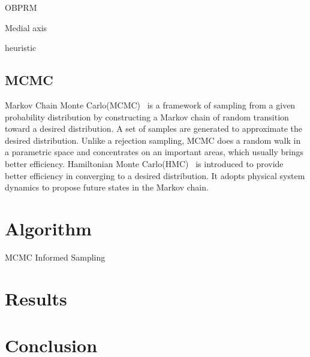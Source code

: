 \documentclass[letterpaper, 10 pt, conference]{ieeeconf}  %
\begin{document}
OBPRM~\cite{ABDJV98, YTEA12}

Medial axis~\cite{LTA03, YDLTA14}

heuristic~\cite{US03, SWT09}

\subsection{MCMC}

Markov Chain Monte Carlo(MCMC)~\cite{ADDJ03} is a framework of sampling from a given probability distribution by constructing a Markov chain of random transition toward a desired distribution.
A set of samples are generated to approximate the desired distribution.
Unlike a rejection sampling, MCMC does a random walk in a parametric space and concentrates on an important areas, which usually brings better efficiency.
Hamiltonian Monte Carlo(HMC)~\cite{N11} is introduced to provide better efficiency in converging to a desired distribution.
It adopts physical system dynamics to propose future states in the Markov chain.

\section{Algorithm}
\label{sec:algorithm}

\begin{algorithm}
	\begin{algorithmic}[1]
		\STATE
   	\end{algorithmic}
	\caption{MCMC Informed Sampling}
	\label{alg:mcmc_informed_sampling}
\end{algorithm}


\section{Results}


\section{Conclusion}








%
\end{document}
